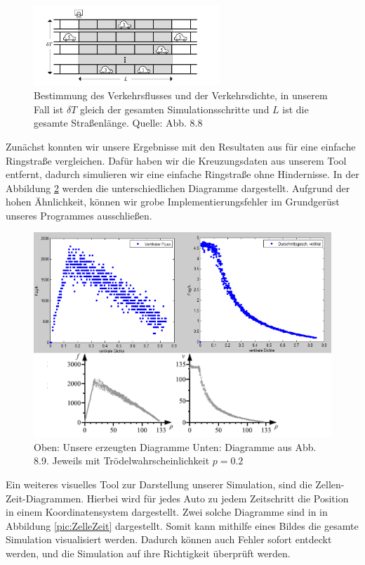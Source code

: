 \begin{figure}%
\centering
\includegraphics[width=7cm]{4_BestFD.png}%
\caption{Bestimmung des Verkehrsflusses und der Verkehrsdichte, in unserem Fall ist $\delta T$ gleich der gesamten Simulationsschritte und $L$ ist die gesamte Straßenlänge. Quelle: \cite{book:bungartz} Abb. 8.8}%
\label{pic:FD_Skizze}%
\end{figure}

Zunächst konnten wir unsere Ergebnisse mit den Resultaten aus \cite{book:bungartz} für eine einfache Ringstraße vergleichen. Dafür haben wir die Kreuzungsdaten aus unserem Tool entfernt, dadurch simulieren wir eine einfache Ringstraße ohne Hindernisse. In der Abbildung \ref{pic:FD_Vergleich} werden die unterschiedlichen Diagramme dargestellt. Aufgrund der hohen Ähnlichkeit, können wir grobe Implementierungsfehler im Grundgerüst unseres Programmes ausschließen.

\begin{figure}%
\centering
\includegraphics[width=12cm]{4_FD_Vergleich.png}%
\caption{Oben: Unsere erzeugten Diagramme Unten: Diagramme aus \cite{book:bungartz} Abb. 8.9. Jeweils mit Trödelwahrscheinlichkeit $p=0.2$}%
\label{pic:FD_Vergleich}%
\end{figure}

Ein weiteres visuelles Tool zur Darstellung unserer Simulation, sind die Zellen-Zeit-Diagrammen. Hierbei wird für jedes Auto zu jedem Zeitschritt die Position in einem Koordinatensystem dargestellt. Zwei solche Diagramme sind in in Abbildung \ref{pic:ZelleZeit} dargestellt. Somit kann mithilfe eines Bildes die gesamte Simulation visualisiert werden. Dadurch können auch Fehler sofort entdeckt werden, und die Simulation auf ihre Richtigkeit überprüft werden. 

